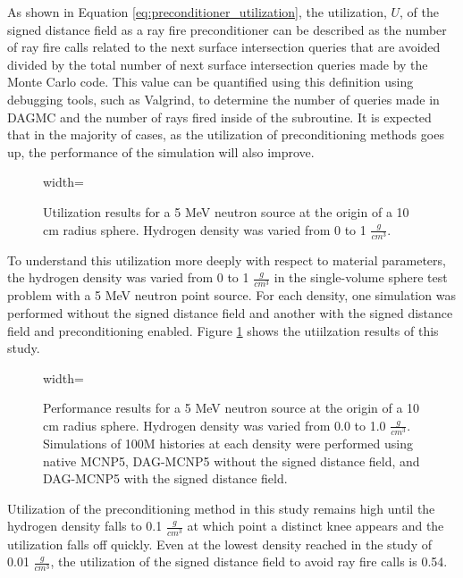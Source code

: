 As shown in Equation \ref{eq:preconditioner_utilization}, the utilization, $U$, of
the signed distance field as a ray fire preconditioner can be described as the
number of ray fire calls related to the next surface intersection queries that
are avoided divided by the total number of next surface intersection queries
made by the Monte Carlo code. This value can be quantified using this definition
using debugging tools, such as Valgrind, to determine the number of queries made
in DAGMC and the number of rays fired inside of the subroutine.  It is expected
that in the majority of cases, as the utilization of preconditioning methods
goes up, the performance of the simulation will also improve.

\begin{figure}[ht]
  \centering
  {width=\textwidth}
  \caption{Utilization results for a 5 MeV neutron source at the origin of a 10 cm radius
    sphere. Hydrogen density was varied from 0 to 1 $\frac{g}{cm^3}$.}
  \label{fig:sphere_hydrogen_density_study_util}
\end{figure}

To understand this utilization more deeply with respect to material parameters,
the hydrogen density was varied from 0 to 1 $\frac{g}{cm^3}$ in the single-volume
sphere test problem with a 5 MeV neutron point source. For each density, one
simulation was performed without the signed distance field and another with the
signed distance field and preconditioning enabled. Figure
\ref{fig:sphere_hydrogen_density_study_util} shows the utiilzation results of this study. 

\begin{figure}[ht]
  \centering
  {width=\textwidth}
  \caption{Performance results for a 5 MeV neutron source at the origin of a 10
    cm radius sphere. Hydrogen density was varied from 0.0 to 1.0
    $\frac{g}{cm^3}$. Simulations of 100M histories at each density were
    performed using native MCNP5, DAG-MCNP5 without the signed distance field,
    and DAG-MCNP5 with the signed distance field.}
  \label{fig:sphere_hydrogen_density_study_perf}
\end{figure}

Utilization of the preconditioning method in this study remains high until the hydrogen
density falls to 0.1 $\frac{g}{cm^3}$ at which point a distinct knee appears and
the utilization falls off quickly. Even at the lowest density reached in the
study of 0.01 $\frac{g}{cm^3}$, the utilization of the signed distance field to
avoid ray fire calls is 0.54.


